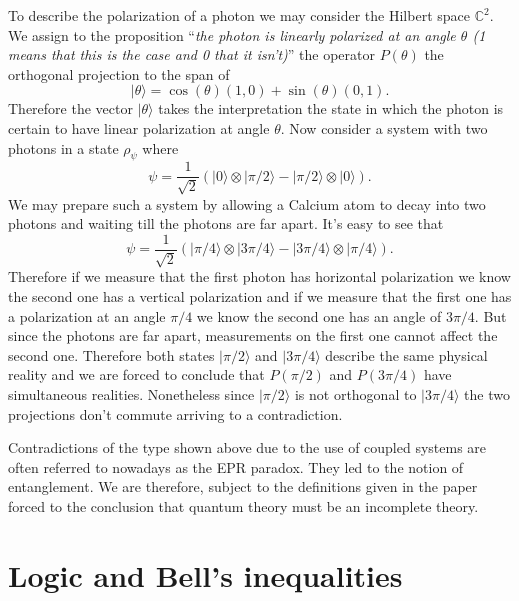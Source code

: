 \begin{example}\label{ex:Bell}
To describe the polarization of a photon we may consider the Hilbert space $\mathbb{C}^2$. We assign to the proposition ``\textit{the photon is linearly polarized at an angle $\theta$ (1 means that this is the case and 0 that it isn't)}'' the operator $P(\theta)$ the orthogonal projection to the span of 
\begin{equation}
|\theta\rangle=\cos(\theta)(1,0)+\sin(\theta)(0,1).
\end{equation}
Therefore the vector $|\theta\rangle$ takes the interpretation the state in which the photon is certain to have linear polarization at angle $\theta$. Now consider a system with two photons in a state $\rho_{\psi}$ where 
\begin{equation}
\psi=\frac{1}{\sqrt{2}}\left(|0\rangle\otimes|\pi/2\rangle-|\pi/2\rangle\otimes|0\rangle\right).
\end{equation}
We may prepare such a system by allowing a Calcium atom to decay into two photons and waiting till the photons are far apart. It's easy to see that 
\begin{equation}
\psi=\frac{1}{\sqrt{2}}\left(|\pi/4\rangle\otimes|3\pi/4\rangle-|3\pi/4\rangle\otimes|\pi/4\rangle\right).
\end{equation}
Therefore if we measure that the first photon has horizontal polarization we know the second one has a vertical polarization and if we measure that the first one has a polarization at an angle $\pi/4$ we know the second one has an angle of $3\pi/4$. But since the photons are far apart, measurements on the first one cannot affect the second one. Therefore both states $|\pi/2\rangle$ and $|3\pi/4\rangle$ describe the same physical reality and we are forced to conclude that $P(\pi/2)$ and $P(3\pi/4)$ have simultaneous realities. Nonetheless since $|\pi/2\rangle$ is not orthogonal to $|3\pi/4\rangle$ the two projections don't commute arriving to a contradiction. 
\end{example}

Contradictions of the type shown above due to the use of coupled systems are often referred to nowadays as the EPR paradox. They led to the notion of entanglement. We are therefore, subject to the definitions given in the paper \cite{Einstein1935} forced to the conclusion that quantum theory must be an incomplete theory.  

\section{Logic and Bell's inequalities}

